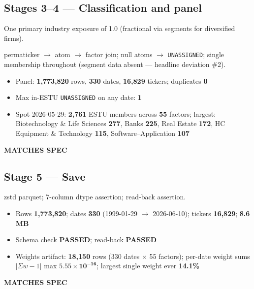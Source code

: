 \documentclass[11pt,a4paper]{article}
\newcommand{\PASS}[1]{\textcolor{pass}{\textbf{#1}}}
\begin{document}
\subsection{Stages 3--4 --- Classification and panel}

\begin{description}[style=nextline]
  \item[PDF SPEC] One primary industry exposure of 1.0 (fractional via segments
    for diversified firms).
  \item[Implementation] permaticker $\to$ atom $\to$ factor join; null atoms
    $\to$ \texttt{UNASSIGNED}; single membership throughout (segment data
    absent --- headline deviation \#2).
  \item[Observed]\phantom{x}
    \begin{itemize}[nosep, topsep=-\parskip]
      \item Panel: \textbf{1{,}773{,}820} rows, \textbf{330} dates,
        \textbf{16{,}829} tickers; duplicates \textbf{0}
      \item Max in-ESTU \texttt{UNASSIGNED} on any date: \textbf{1}
      \item Spot 2026-05-29: \textbf{2{,}761} ESTU members across
        \textbf{55} factors; largest: Biotechnology \& Life Sciences
        \textbf{277}, Banks \textbf{225}, Real Estate \textbf{172},
        HC Equipment \& Technology \textbf{115}, Software--Application \textbf{107}
    \end{itemize}
  \item[Status] \PASS{MATCHES SPEC}
\end{description}

\subsection{Stage 5 --- Save}

\begin{description}[style=nextline]
  \item[Implementation] zstd parquet; 7-column dtype assertion; read-back assertion.
  \item[Observed]\phantom{x}
    \begin{itemize}[nosep, topsep=-\parskip]
      \item Rows \textbf{1{,}773{,}820}; dates \textbf{330}
        (1999-01-29 $\to$ 2026-06-10); tickers \textbf{16{,}829}; \textbf{8.6 MB}
      \item Schema check \PASS{PASSED}; read-back \PASS{PASSED}
      \item Weights artifact: \textbf{18{,}150} rows (330 dates $\times$ 55
        factors); per-date weight sums $|\Sigma w - 1|$ max
        $\mathbf{5.55\times10^{-16}}$; largest single weight ever
        \textbf{14.1\%}
    \end{itemize}
  \item[Status] \PASS{MATCHES SPEC}
\end{description}
\end{document}
